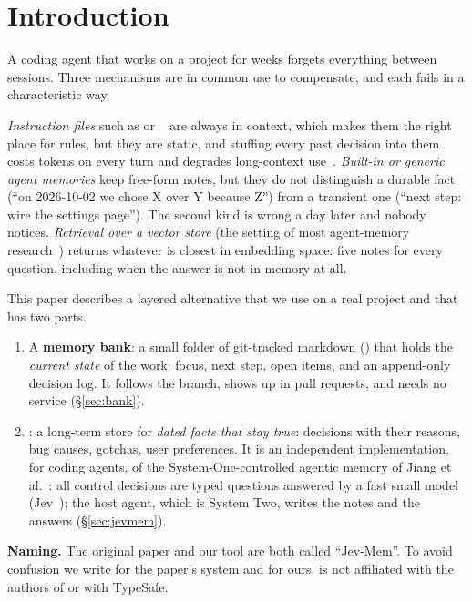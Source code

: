 \section{Introduction}
\label{sec:intro}

A coding agent that works on a project for weeks forgets everything between sessions. Three mechanisms are in common use to compensate, and each fails in a characteristic way.

\emph{Instruction files} such as  or ~\cite{agentsmd} are always in context, which makes them the right place for rules, but they are static, and stuffing every past decision into them costs tokens on every turn and degrades long-context use~\cite{liu2024lost}. \emph{Built-in or generic agent memories} keep free-form notes, but they do not distinguish a durable fact (``on 2026-10-02 we chose X over Y because Z'') from a transient one (``next step: wire the settings page''). The second kind is wrong a day later and nobody notices. \emph{Retrieval over a vector store} (the setting of most agent-memory research~\cite{packer2023memgpt,xu2025amem,chhikara2025mem0}) returns whatever is closest in embedding space: five notes for every question, including when the answer is not in memory at all.

This paper describes a layered alternative that we use on a real project and that has two parts.

\begin{enumerate}
\item A \textbf{memory bank}: a small folder of git-tracked markdown () that holds the \emph{current state} of the work: focus, next step, open items, and an append-only decision log. It follows the branch, shows up in pull requests, and needs no service (\S\ref{sec:bank}).
\item \textbf{\jevmem}: a long-term store for \emph{dated facts that stay true}: decisions with their reasons, bug causes, gotchas, user preferences. It is an independent implementation, for coding agents, of the System-One-controlled agentic memory of Jiang et al.~\cite{jiang2026jevmem}: all control decisions are typed questions answered by a fast small model (Jev~\cite{typesafe2026}); the host agent, which is System Two, writes the notes and the answers (\S\ref{sec:jevmem}).
\end{enumerate}

\noindent\textbf{Naming.} The original paper and our tool are both called ``Jev-Mem''. To avoid confusion we write \jevmempaper{} for the paper's system and \jevmem{} for ours. \jevmem{} is not affiliated with the authors of \jevmempaper{} or with TypeSafe.

